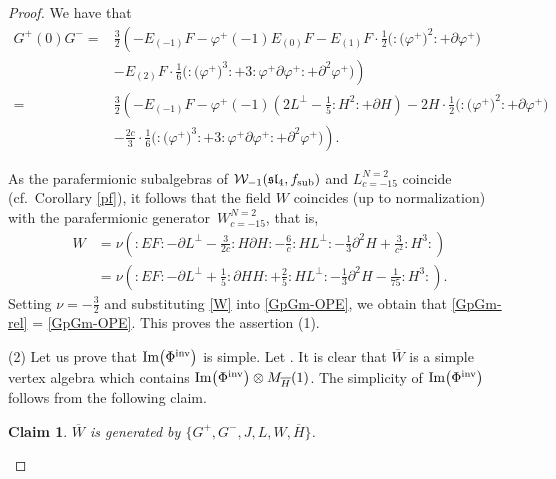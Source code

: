 \documentclass[pdftex]{sigma}
\numberwithin{equation}{section}
\newcommand{\F}{\mathcal F}
\newtheorem{Claim}[Theorem]{Claim}
\begin{document}
\begin{proof}
We have that
 \begin{align}
G^+(0) G^-={}& \frac{3}{2}\left(-E_{(-1)}F -\varphi^+(-1) E_{(0)}F - E_{(1)}F\cdot \frac{1}{2}\bigl({:}\bigl(\varphi^+\bigr)^2{:}+\partial \varphi^+\bigr) \right. \nonumber\\
&\left. - E_{(2)}F\cdot \frac{1}{6}\bigl({:} \bigl(\varphi^+ \bigr)^3 {:}+3{:}\varphi ^+ \partial \varphi^+{:} + \partial ^2 \varphi^+\bigr) \right) \nonumber\\
={}& \frac{3}{2}\left(-E_{(-1)}F -\varphi^+(-1) \left(2L^{\perp} - \frac{1}{5}{:}H^2{:} +\partial H\right) - 2H\cdot\frac{1}{2}\bigl({:}\bigl(\varphi^+\bigr)^2{:}+\partial \varphi^+\bigr) \right. \nonumber\\
&\left.- \frac{2c}{3}\cdot \frac{1}{6}\bigl({:}\bigl(\varphi^+\bigr)^3{:} + 3{:}\varphi^+ \partial \varphi^+{:} + \partial ^2 \varphi^+\bigr) \right) .  \label{GpGm-rel}
\end{align}




As the parafermionic subalgebras of $\mathcal W_{-1} (\mathfrak{sl}_4, f_{\rm sub})$ and $L^{N=2}_{c=-15} $ coincide (cf.\ Corollary \ref{pf}), it follows that the field $W$ coincides (up to normalization) with the parafermionic generator~$W^{N=2}_{c=-15}$, that is,
\begin{align}
	W	&= \nu \left({:}E F{:} - \partial L^{\perp} - \frac{3}{2c}{:}H\partial H{:} -\frac{6}{c}{:}HL^{\perp}{:}- \frac{1}{3}\partial^2H + \frac{3}{c^2}{:}H^3{:} \right) \nonumber \\
	&= \nu \left({:}E F{:} - \partial L^{\perp}+ \frac{1}{5}{:}\partial H H {:} + \frac{2}{5}{:}HL^{\perp}{:} -\frac{1}{3}\partial^2H - \frac{1}{75}{:}H^3{:} \right). \label{W}
\end{align}
Setting $\nu = -\frac{3}{2}$ and substituting \eqref{W} into \eqref{GpGm-OPE}, we obtain that \eqref{GpGm-rel} = \eqref{GpGm-OPE}.
This proves the assertion (1).

(2) Let us prove that $\operatorname{Im} \bigl(\Phi^{\rm inv}\bigr) $ is simple. Let \smash{$\overline{W} = \operatorname{Ker}_{ L^{N=2}_{c=-15} \otimes \F_{1}} \overline{H} (0)$}. It is clear that $\overline{W}$ is a simple vertex algebra which contains $ \operatorname{Im} \bigl(\Phi^{\rm inv}\bigr) \otimes M_{\overline{H}} (1)$. The simplicity of $ \operatorname{Im} \bigl(\Phi^{\rm inv}\bigr) $ follows from the following claim.

\begin{Claim}\label{Claim2}
$\overline W$ is generated by $\big\{ G^+, G^-, J, L, W, \overline{H} \big\}$.
\end{Claim}


\end{proof}
\end{document}
